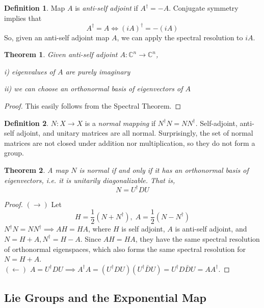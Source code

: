 \documentclass{article}
\newtheorem{theorem}{Theorem}[section]
\theoremstyle{remark}
\theoremstyle{definition}
\newtheorem{definition}{Definition}[section]
\begin{document}
    \begin{definition}
    Map $A$ is \textit{anti-self adjoint }if $A^\dagger = - A$. Conjugate symmetry implies that
    \[ A^\dagger = A \iff (i A)^\dagger = - (i A)\]
    So, given an anti-self adjoint map $A$, we can apply the spectral resolution to $iA$. 
    \end{definition}

    \begin{theorem}
    Given anti-self adjoint $A: \mathbb{C}^n \longrightarrow \mathbb{C}^n$, 

    i) eigenvalues of $A$ are purely imaginary

    ii) we can choose an orthonormal basis of eigenvectors of $A$
    \end{theorem}

    \begin{proof}
    This easily follows from the Spectral Theorem. 
    \end{proof}

    \begin{definition}
    $N: X \longrightarrow X$ is a \textit{normal mapping} if $N^\dagger N = N N^\dagger$. Self-adjoint, anti-self adjoint, and unitary matrices are all normal. Surprisingly, the set of normal matrices are not closed under addition nor multiplication, so they do not form a group. 
    \end{definition}

    \begin{theorem}
    A map $N$ is normal if and only if it has an orthonormal basis of eigenvectors, i.e. it is unitarily diagonalizable. That is, 
    \[N = U^\dagger D U \]
    \end{theorem}

    \begin{proof}
    $(\rightarrow)$ Let 
    \[H = \frac{1}{2} (N + N^\dagger), \; A = \frac{1}{2} (N - N^\dagger)\]
    $N^\dagger N = N N^\dagger \implies A H = H A$, where $H$ is self adjoint, $A$ is anti-self adjoint, and $N = H + A, N^\dagger = H - A$. Since $A H = H A$, they have the same spectral resolution of orthonormal eigenspaces, which also forms the same spectral resolution for $N = H + A$. \\
    $(\leftarrow)$ $A = U^\dagger D U \implies A^\dagger A = (U^\dagger D U) (U^\dagger \bar{D} U) = U^\dagger D \bar{D} U = A A^\dagger$. 
    \end{proof}

  \subsection{Lie Groups and the Exponential Map}
\end{document}
